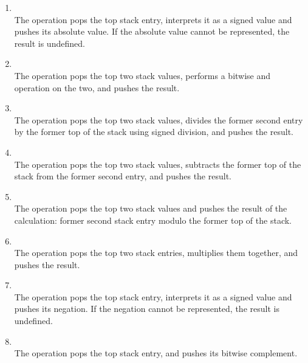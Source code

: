 \begin{enumerate}[1]
\item {}  \\
The  operation pops the top stack entry, interprets
it as a signed value and pushes its absolute value. If the
absolute value cannot be represented, the result is undefined.

\item {} \\
The  operation pops the top two stack values, performs
a bitwise and operation on the two, and pushes the result.

\item {} \\
The  operation pops the top two stack values, divides the former second entry by
the former top of the stack using signed division, and pushes the result.

\item {} \\
The  operation pops the top two stack values, subtracts the former top of the
stack from the former second entry, and pushes the result.

\item {}\\
The  operation pops the top two stack values and pushes the result of the
calculation: former second stack entry modulo the former top of the stack.

\item {} \\
The  operation pops the top two stack entries, multiplies them together, and
pushes the result.

\item  {} \\
The  operation pops the top stack entry, interprets
it as a signed value and pushes its negation. If the negation
cannot be represented, the result is undefined.

\item  {} \\
The  operation pops the top stack entry, and pushes
its bitwise complement.


\end{enumerate}
